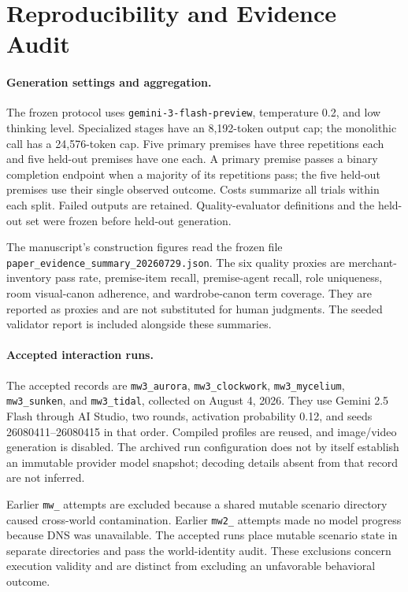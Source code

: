 \section{Reproducibility and Evidence Audit}
\label{app:repro}

\paragraph{Generation settings and aggregation.}
The frozen protocol uses \texttt{gemini-3-flash-preview}, temperature 0.2,
and low thinking level. Specialized stages have an 8,192-token output cap;
the monolithic call has a 24,576-token cap. Five primary premises have three
repetitions each and five held-out premises have one each. A primary premise
passes a binary completion endpoint when a majority of its repetitions pass;
the five held-out premises use their single observed outcome. Costs summarize
all trials within each split. Failed outputs are retained. Quality-evaluator
definitions and the held-out set were frozen before held-out generation.

The manuscript's construction figures read the frozen file
\texttt{paper\_evidence\_summary\_20260729.json}. The six quality proxies are
merchant-inventory pass rate, premise-item recall, premise-agent recall, role
uniqueness, room visual-canon adherence, and wardrobe-canon term coverage.
They are reported as proxies and are not substituted for human judgments.
The seeded validator report is included alongside these summaries.

\paragraph{Accepted interaction runs.}
The accepted records are \texttt{mw3\_aurora}, \texttt{mw3\_clockwork},
\texttt{mw3\_mycelium}, \texttt{mw3\_sunken}, and \texttt{mw3\_tidal}, collected
on August 4, 2026. They use Gemini 2.5 Flash through AI Studio, two rounds,
activation probability 0.12, and seeds 26080411--26080415 in that order.
Compiled profiles are reused, and image/video generation is disabled. The
archived run configuration does not by itself establish an immutable provider
model snapshot; decoding details absent from that record are not inferred.

Earlier \texttt{mw\_} attempts are excluded because a shared mutable scenario
directory caused cross-world contamination. Earlier \texttt{mw2\_} attempts
made no model progress because DNS was unavailable. The accepted runs place
mutable scenario state in separate directories and pass the world-identity
audit. These exclusions concern execution validity and are distinct from
excluding an unfavorable behavioral outcome.


